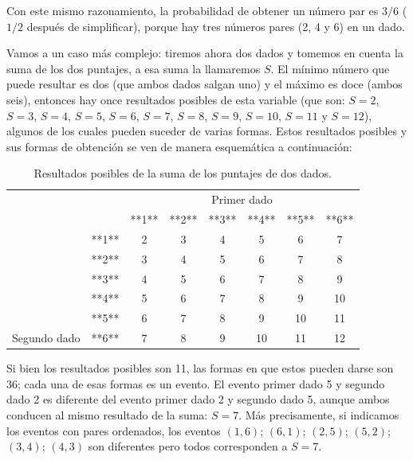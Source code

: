 \documentclass[]{book}
\begin{document}
Con este mismo razonamiento, la probabilidad de obtener un número par es
\(3/6\) (\(1/2\) después de simplificar), porque hay tres números pares (2, 4 y
6) en un dado.

Vamos a un caso más complejo: tiremos ahora dos dados y tomemos en
cuenta la suma de los dos puntajes, a esa suma la llamaremos \(S\). El
mínimo número que puede resultar es dos (que ambos dados salgan uno) y
el máximo es doce (ambos seis), entonces hay once resultados posibles de
esta variable (que son: \(S = 2\), \(S = 3\), \(S = 4\), \(S = 5\), \(S = 6\), \(S = 7\), \(S = 8\),
\(S = 9\), \(S = 10\), \(S = 11\) y \(S = 12\)), algunos de los cuales pueden suceder de
varias formas. Estos resultados posibles y sus formas de obtención se
ven de manera esquemática a continuación:

\begin{table}

\caption{\label{tab:unnamed-chunk-215}Resultados posibles de la suma de los puntajes de dos dados.}
\centering
\begin{tabular}[t]{lccccccc}
\toprule
\multicolumn{2}{c}{ } & \multicolumn{6}{c}{Primer dado} \\
\cmidrule(l{3pt}r{3pt}){3-8}
 &  & **1** & **2** & **3** & **4** & **5** & **6**\\
\midrule
\rowcolor{gray!6}   & **1** & 2 & 3 & 4 & 5 & 6 & 7\\
\cmidrule{2-8}
 & **2** & 3 & 4 & 5 & 6 & 7 & 8\\
\cmidrule{2-8}
\rowcolor{gray!6}   & **3** & 4 & 5 & 6 & 7 & 8 & 9\\
\cmidrule{2-8}
 & **4** & 5 & 6 & 7 & 8 & 9 & 10\\
\cmidrule{2-8}
\rowcolor{gray!6}   & **5** & 6 & 7 & 8 & 9 & 10 & 11\\
\cmidrule{2-8}
\multirow[t]{-6}{*}{\raggedright\arraybackslash Segundo dado} & **6** & 7 & 8 & 9 & 10 & 11 & 12\\
\bottomrule
\end{tabular}
\end{table}

Si bien los resultados posibles son 11, las formas en que estos pueden
darse son 36; cada una de esas formas es un evento. El evento primer
dado 5 y segundo dado 2 es diferente del evento primer dado 2 y segundo
dado 5, aunque ambos conducen al mismo resultado de la suma: \(S=7\). Más precisamente,
si indicamos los eventos con pares ordenados, los eventos \((1,6)\); \((6,1)\);
\((2,5)\); \((5,2)\); \((3,4)\); \((4,3)\) son diferentes pero todos corresponden a \(S=7\).
\end{document}
